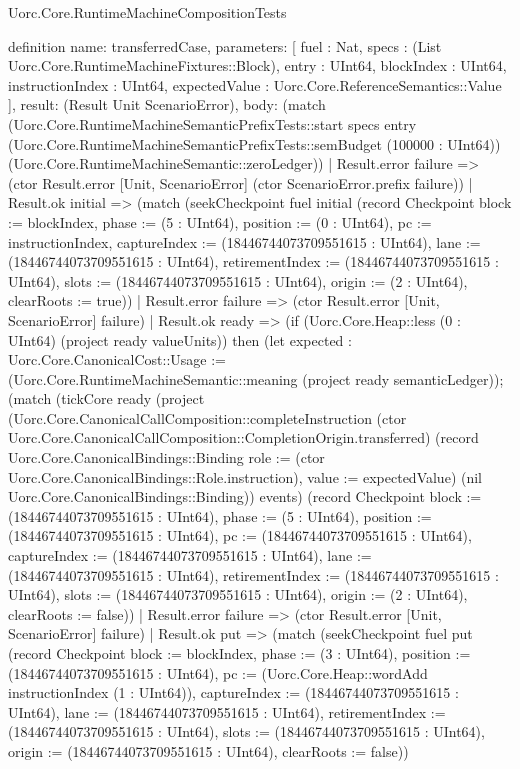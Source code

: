 \begin{lexlean}{Uorc.Core.RuntimeMachineCompositionTests}
\begin{semanticmodule}
definition{
  name: transferredCase,
  parameters: [
    fuel : Nat,
    specs : (List Uorc.Core.RuntimeMachineFixtures::Block),
    entry : UInt64,
    blockIndex : UInt64,
    instructionIndex : UInt64,
    expectedValue : Uorc.Core.ReferenceSemantics::Value
  ],
  result: (Result Unit ScenarioError),
  body: (match (Uorc.Core.RuntimeMachineSemanticPrefixTests::start specs entry (Uorc.Core.RuntimeMachineSemanticPrefixTests::semBudget (100000 : UInt64)) (Uorc.Core.RuntimeMachineSemantic::zeroLedger))
    | Result.error failure => (ctor Result.error [Unit, ScenarioError] (ctor ScenarioError.prefix failure))
    | Result.ok initial => (match (seekCheckpoint fuel initial (record Checkpoint {block := blockIndex, phase := (5 : UInt64), position := (0 : UInt64), pc := instructionIndex, captureIndex := (18446744073709551615 : UInt64), lane := (18446744073709551615 : UInt64), retirementIndex := (18446744073709551615 : UInt64), slots := (18446744073709551615 : UInt64), origin := (2 : UInt64), clearRoots := true}))
      | Result.error failure => (ctor Result.error [Unit, ScenarioError] failure)
      | Result.ok ready => (if (Uorc.Core.Heap::less (0 : UInt64) (project ready valueUnits)) then (let expected : Uorc.Core.CanonicalCost::Usage := (Uorc.Core.RuntimeMachineSemantic::meaning (project ready semanticLedger)); (match (tickCore ready (project (Uorc.Core.CanonicalCallComposition::completeInstruction (ctor Uorc.Core.CanonicalCallComposition::CompletionOrigin.transferred) (record Uorc.Core.CanonicalBindings::Binding {role := (ctor Uorc.Core.CanonicalBindings::Role.instruction), value := expectedValue}) (nil Uorc.Core.CanonicalBindings::Binding)) events) (record Checkpoint {block := (18446744073709551615 : UInt64), phase := (5 : UInt64), position := (18446744073709551615 : UInt64), pc := (18446744073709551615 : UInt64), captureIndex := (18446744073709551615 : UInt64), lane := (18446744073709551615 : UInt64), retirementIndex := (18446744073709551615 : UInt64), slots := (18446744073709551615 : UInt64), origin := (2 : UInt64), clearRoots := false}))
        | Result.error failure => (ctor Result.error [Unit, ScenarioError] failure)
        | Result.ok put => (match (seekCheckpoint fuel put (record Checkpoint {block := blockIndex, phase := (3 : UInt64), position := (18446744073709551615 : UInt64), pc := (Uorc.Core.Heap::wordAdd instructionIndex (1 : UInt64)), captureIndex := (18446744073709551615 : UInt64), lane := (18446744073709551615 : UInt64), retirementIndex := (18446744073709551615 : UInt64), slots := (18446744073709551615 : UInt64), origin := (18446744073709551615 : UInt64), clearRoots := false}))
}
\end{semanticmodule}
\end{lexlean}
